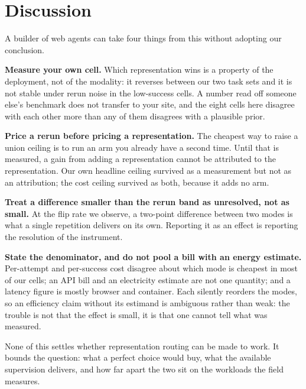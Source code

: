 \section{Discussion}\label{sec:discussion}

A builder of web agents can take four things from this without adopting our conclusion.

 \textbf{Measure your own cell.} Which representation wins is a property of the deployment, not of the modality: it reverses between our two task sets and it is not stable under rerun noise in the low-success cells. A number read off someone else's benchmark does not transfer to your site, and the eight cells here disagree with each other more than any of them disagrees with a plausible prior.

 \textbf{Price a rerun before pricing a representation.} The cheapest way to raise a union ceiling is to run an arm you already have a second time. Until that is measured, a gain from adding a representation cannot be attributed to the representation. Our own headline ceiling survived as a measurement but not as an attribution; the cost ceiling survived as both, because it adds no arm.

\textbf{Treat a difference smaller than the rerun band as unresolved, not as small.} At the flip rate we observe, a two-point difference between two modes is what a single repetition delivers on its own. Reporting it as an effect is reporting the resolution of the instrument.

 \textbf{State the denominator, and do not pool a bill with an energy estimate.} Per-attempt and per-success cost disagree about which mode is cheapest in most of our cells; an API bill and an electricity estimate are not one quantity; and a latency figure is mostly browser and container. Each silently reorders the modes, so an efficiency claim without its estimand is ambiguous rather than weak: the trouble is not that the effect is small, it is that one cannot tell what was measured.

 None of this settles whether representation routing can be made to work. It bounds the question: what a perfect choice would buy, what the available supervision delivers, and how far apart the two sit on the workloads the field measures.
